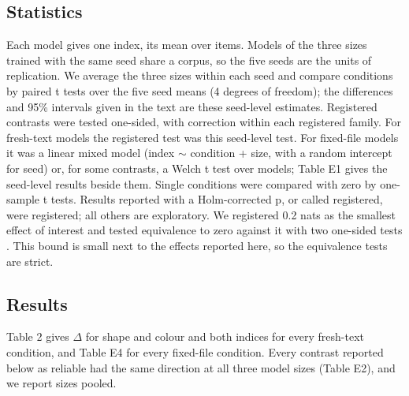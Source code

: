 \subsection{Statistics}
Each model gives one index, its mean over items. Models of the three sizes trained with the same seed share a corpus, so the five seeds are the units of replication. We average the three sizes within each seed and compare conditions by paired t tests over the five seed means (4 degrees of freedom); the differences and 95\% intervals given in the text are these seed-level estimates. Registered contrasts were tested one-sided, with \citet{holm1979} correction within each registered family. For fresh-text models the registered test was this seed-level test. For fixed-file models it was a linear mixed model (index $\sim$ condition + size, with a random intercept for seed) or, for some contrasts, a Welch t test over models; Table E1 gives the seed-level results beside them. Single conditions were compared with zero by one-sample t tests. Results reported with a Holm-corrected p, or called registered, were registered; all others are exploratory. We registered 0.2 nats as the smallest effect of interest and tested equivalence to zero against it with two one-sided tests \cite{lakens2017}. This bound is small next to the effects reported here, so the equivalence tests are strict.

\subsection{Results}
Table 2 gives $\Delta$ for shape and colour and both indices for every fresh-text condition, and Table E4 for every fixed-file condition. Every contrast reported below as reliable had the same direction at all three model sizes (Table E2), and we report sizes pooled.

